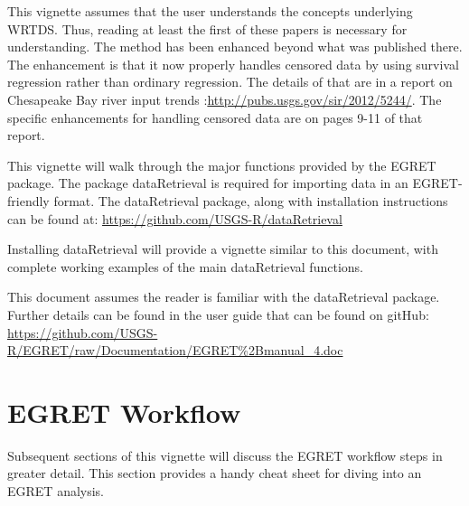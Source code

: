 \documentclass[a4paper,11pt]{article}\usepackage[]{graphicx}\usepackage[]{color}
\begin{document}
This vignette assumes that the user understands the concepts underlying WRTDS.  Thus, reading at least the first of these papers is necessary for understanding.  The method has been enhanced beyond what was published there.  The enhancement is that it now properly handles censored data by using survival regression rather than ordinary regression.  The details of that are in a report on Chesapeake Bay river input trends \cite{HirschIV}:\url{http://pubs.usgs.gov/sir/2012/5244/}.  The specific enhancements for handling censored data are on pages 9-11 of that report.

This vignette will walk through the major functions provided by the EGRET package. The package dataRetrieval is required for importing data in an EGRET-friendly format. The dataRetrieval package, along with installation instructions can be found at:
\url{https://github.com/USGS-R/dataRetrieval}

Installing dataRetrieval will provide a vignette similar to this document, with complete working examples of the main dataRetrieval functions.

This document assumes the reader is familiar with the dataRetrieval package. Further details can be found in the user guide that can be found on gitHub: \url{https://github.com/USGS-R/EGRET/raw/Documentation/EGRET%2Bmanual_4.doc}

\section{EGRET Workflow}
Subsequent sections of this vignette will discuss the EGRET workflow steps in greater detail. This section provides a handy cheat sheet for diving into an EGRET analysis.
\end{document}
